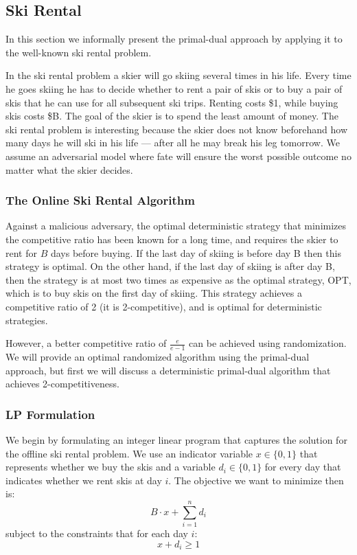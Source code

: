 \subsection{Ski Rental}

In this section we informally present the primal-dual approach by applying it to the well-known ski rental problem.

In the ski rental problem a skier will go skiing several times in his life.
Every time he goes skiing he has to decide whether to rent a pair of skis or to buy a pair of skis that he can use for all subsequent ski trips.
Renting costs \$1, while buying skis costs \$B.
The goal of the skier is to spend the least amount of money.
The ski rental problem is interesting because the skier does not know beforehand how many days he will ski in his life --- after all he may break his leg tomorrow.
We assume an adversarial model where fate will ensure the worst possible outcome no matter what the skier decides.

\subsubsection{The Online Ski Rental Algorithm}
Against a malicious adversary, the optimal deterministic strategy that minimizes the competitive ratio has been known for a long time, and requires the skier to rent for $B$ days before buying.
If the last day of skiing is before day B then this strategy is optimal.
On the other hand, if the last day of skiing is after day B, then the strategy is at most two times as expensive as the optimal strategy, OPT, which is to buy skis on the first day of skiing.
This strategy achieves a competitive ratio of 2 (it is 2-competitive), and is optimal for deterministic strategies.

However, a better competitive ratio of $\frac{e}{e-1}$ can be achieved using randomization.
We will provide an optimal randomized algorithm using the primal-dual approach, but first we will discuss a deterministic primal-dual algorithm that achieves 2-competitiveness.

\subsubsection{LP Formulation}
We begin by formulating an integer linear program that captures the solution for the offline ski rental problem.
We use an indicator variable $x \in \{0,1\}$ that represents whether we buy the skis and a variable $d_i \in \{0,1\}$ for every day that indicates whether we rent skis at day $i$. 
The objective we want to minimize then is:
\[ B\cdot x + \sum^n_{i=1} d_i \]
subject to the constraints that for each day $i$:
\[ x + d_i \ge 1 \]

